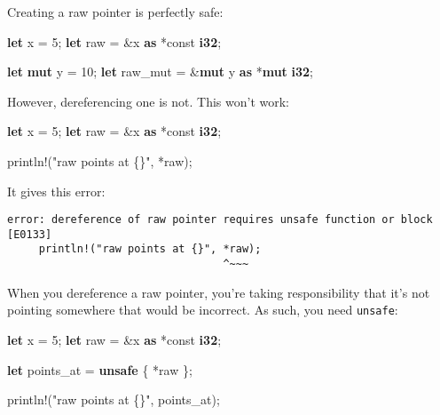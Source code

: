 \documentclass[a4paper,]{book}
\newenvironment{Shaded}{\begin{snugshade}}{\end{snugshade}}
\newcommand{\KeywordTok}[1]{\textcolor[rgb]{0.13,0.29,0.53}{\textbf{{#1}}}}
\newcommand{\DecValTok}[1]{\textcolor[rgb]{0.00,0.00,0.81}{{#1}}}
\newcommand{\StringTok}[1]{\textcolor[rgb]{0.31,0.60,0.02}{{#1}}}
\newcommand{\OtherTok}[1]{\textcolor[rgb]{0.56,0.35,0.01}{{#1}}}
\newcommand{\NormalTok}[1]{{#1}}
\begin{document}
Creating a raw pointer is perfectly safe:

\begin{Shaded}
\begin{Highlighting}[]
\KeywordTok{let} \NormalTok{x = }\DecValTok{5}\NormalTok{;}
\KeywordTok{let} \NormalTok{raw = &x }\KeywordTok{as} \NormalTok{*const }\KeywordTok{i32}\NormalTok{;}

\KeywordTok{let} \KeywordTok{mut} \NormalTok{y = }\DecValTok{10}\NormalTok{;}
\KeywordTok{let} \NormalTok{raw_mut = &}\KeywordTok{mut} \NormalTok{y }\KeywordTok{as} \NormalTok{*}\KeywordTok{mut} \KeywordTok{i32}\NormalTok{;}
\end{Highlighting}
\end{Shaded}

However, dereferencing one is not. This won't work:

\begin{Shaded}
\begin{Highlighting}[]
\KeywordTok{let} \NormalTok{x = }\DecValTok{5}\NormalTok{;}
\KeywordTok{let} \NormalTok{raw = &x }\KeywordTok{as} \NormalTok{*const }\KeywordTok{i32}\NormalTok{;}

\OtherTok{println!}\NormalTok{(}\StringTok{"raw points at \{\}"}\NormalTok{, *raw);}
\end{Highlighting}
\end{Shaded}

It gives this error:

\begin{verbatim}
error: dereference of raw pointer requires unsafe function or block [E0133]
     println!("raw points at {}", *raw);
                                  ^~~~
\end{verbatim}

When you dereference a raw pointer, you're taking responsibility that
it's not pointing somewhere that would be incorrect. As such, you need
\texttt{unsafe}:

\begin{Shaded}
\begin{Highlighting}[]
\KeywordTok{let} \NormalTok{x = }\DecValTok{5}\NormalTok{;}
\KeywordTok{let} \NormalTok{raw = &x }\KeywordTok{as} \NormalTok{*const }\KeywordTok{i32}\NormalTok{;}

\KeywordTok{let} \NormalTok{points_at = }\KeywordTok{unsafe} \NormalTok{\{ *raw \};}

\OtherTok{println!}\NormalTok{(}\StringTok{"raw points at \{\}"}\NormalTok{, points_at);}
\end{Highlighting}
\end{Shaded}
\end{document}
